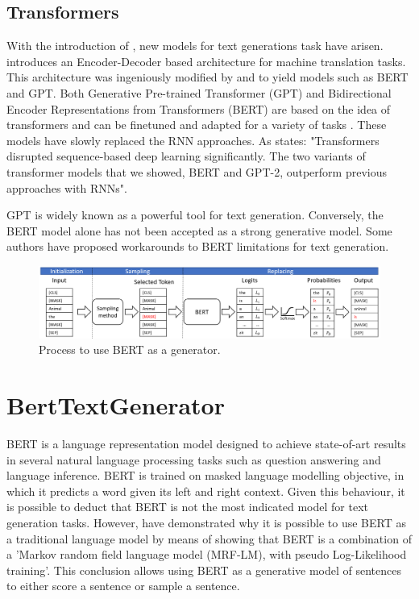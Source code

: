\documentclass[10pt,twocolumn,letterpaper]{article}
\begin{document}
\subsection{Transformers}

With the introduction of \cite{attention}, new models for text generations task have arisen.
\cite{attention} introduces an Encoder-Decoder based architecture for machine translation tasks.
This architecture was ingeniously modified by \cite{bert} and \cite{gpt} to yield models such as BERT and GPT.
Both Generative Pre-trained Transformer (GPT) and Bidirectional Encoder Representations from Transformers (BERT)
are based on the idea of transformers and can be finetuned and
adapted for a variety of tasks \cite{gptapps1} \cite{gptapps2} \cite{gptapps3} \cite{gptapps4} \cite{gptapps5}.
These models have slowly replaced the RNN approaches.
As \cite{modernMethods} states: "Transformers disrupted sequence-based deep learning significantly.
The two variants of transformer models that we showed, BERT and GPT-2, outperform
previous approaches with RNNs".

GPT is widely known as a powerful tool for text generation.
Conversely, the BERT model alone has not been accepted as a strong generative model.
Some authors \cite{wang2019bert} have proposed workarounds to BERT limitations for text generation.

\begin{figure}[t]
   \centering
   \includegraphics[scale=0.6]{BERTfunc.PNG}
   \caption{Process to use BERT as a generator.}
   \label{fig:BertFig}
\end{figure}

\section{BertTextGenerator}
BERT is a language representation model designed to achieve state-of-art results
in several natural language processing tasks such as question answering and language inference.
BERT is trained on masked language modelling objective, in which it predicts a word given its
left and right context.
Given this behaviour, it is possible to deduct that BERT is not the most
indicated model for text generation tasks.
However, \cite{wang2019bert} have demonstrated why it is possible to use BERT as a traditional
language model by means of showing that BERT is a combination of a 'Markov random field
language model (MRF-LM), with pseudo Log-Likelihood training'.
This conclusion allows using BERT as a generative model of sentences to either score a sentence or
sample a sentence.
\end{document}
